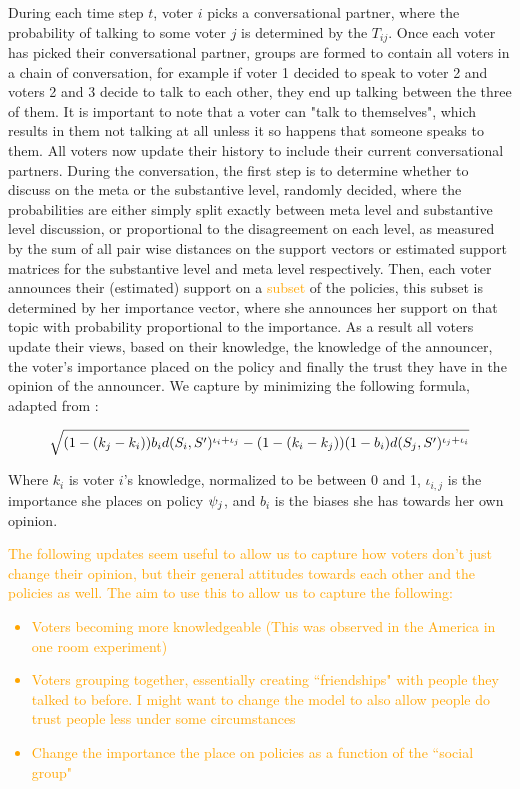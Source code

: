 During each time step $t$, voter $i$ picks a conversational partner, where the probability of talking to some voter $j$ is determined by the $T_{ij}$. Once each voter has picked their conversational partner, groups are formed to contain all voters in a chain of conversation, for example if voter 1 decided to speak to voter 2 and voters 2 and 3 decide to talk to each other, they end up talking between the three of them. It is important to note that a voter can "talk to themselves", which results in them not talking at all unless it so happens that someone speaks to them. All voters now update their history to include their current conversational partners. During the conversation, the first step is to determine whether to discuss on the meta or the substantive level, randomly decided, where the probabilities are either simply split exactly between meta level and substantive level discussion, or proportional to the disagreement on each level, as measured by the sum of all pair wise distances on the support vectors or estimated support matrices for the substantive level and meta level respectively.
Then, each voter announces their (estimated) support on a \textcolor{orange}{subset} of the policies, this subset is determined by her importance vector, where she announces her support on that topic with probability proportional to the importance. As a result all voters update their views, based on their knowledge, the knowledge of the announcer, the voter's importance placed on the policy and finally the trust they have in the opinion of the announcer. We capture by minimizing the following formula, adapted from \citet{radDeliberationSinglePeakednessCoherent2021}:

\begin{equation}
	\label{eq:abm_update_function}
	\sqrt{
		(1-(k_j-k_i))b_id(S_i, S')^{\iota_i + \iota_j}
		-
		(1 - (k_i-k_j))(1-b_i)d(S_j, S')^{\iota_j + \iota_i}
	}
\end{equation}

Where $k_{i}$ is voter $i$'s knowledge, normalized to be between 0 and 1, $\iota_{i,j}$ is the importance she places on policy $\psi_{j}$, and $b_{i}$ is the biases she has towards her own opinion.

\textcolor{orange}{The following updates seem useful to allow us to capture how voters don't just change their opinion, but their general attitudes towards each other and the policies as well. The aim to use this to allow us to capture the following:}
\textcolor{orange}{
	\begin{itemize}
		\item Voters becoming more knowledgeable (This was observed in the America in one room experiment)
		\item Voters grouping together, essentially creating ``friendships" with people they talked to before. I might want to change the model to also allow people do trust people less under some circumstances
		\item Change the importance the place on policies as a function of the ``social group"
	\end{itemize}}

